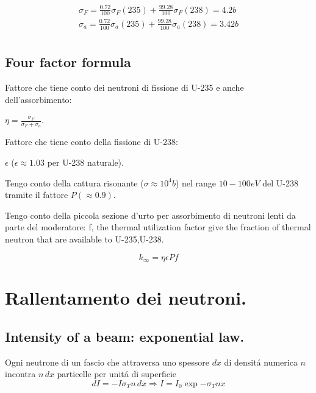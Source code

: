 \begin{align*}
\sigma_F=\frac{0.72}{100}\sigma_F(235)+\frac{99.28}{100}\sigma_F(238)=4.2b\\
\sigma_a=\frac{0.72}{100}\sigma_a(235)+\frac{99.28}{100}\sigma_a(238)=3.42b\\
\end{align*}

\subsection{Four factor formula}

\begin{enumerate*}
\item Fattore che tiene conto dei neutroni di fissione di U-235 e anche dell'assorbimento:

$\eta=\frac{\sigma_F}{\sigma_F+\sigma_a}$.

\item Fattore che tiene conto della fissione di U-238:

$\epsilon$ ($\epsilon\approx1.03$ per U-238 naturale).

\item Tengo conto della cattura risonante ($\sigma\approx10^4b$) nel range $10-100eV$ del U-238 tramite il fattore $P(\approx0.9)$.

\item Tengo conto della piccola sezione d'urto per assorbimento di neutroni lenti da parte del moderatore: f, the thermal utilization factor give the fraction of thermal neutron that are available to U-235,U-238.

\end{enumerate*}


\begin{equation*}
k_{\infty}=\eta\epsilon Pf
\end{equation*}

\section{Rallentamento dei neutroni.}

\subsection{Intensity of a beam: exponential law.}
Ogni neutrone di un fascio che attraversa uno spessore $dx$ di densit\'a numerica $n$ incontra $n\,dx$ particelle per unit\'a di superficie
\begin{equation*}
dI=-I\sigma_Tn\,dx\Rightarrow I=I_0\exp{-\sigma_Tnx}
\end{equation*}

